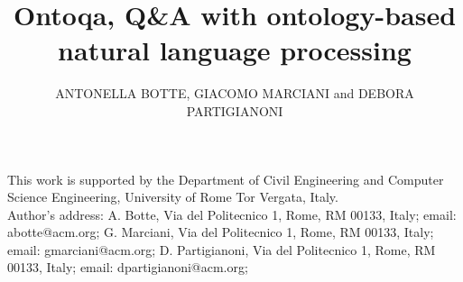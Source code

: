 \documentclass[acmutv-cw-ai]{acmlarge}
\title{Ontoqa, Q\&A with ontology-based natural language processing}
\author{ANTONELLA BOTTE, GIACOMO MARCIANI and DEBORA PARTIGIANONI \affil{University of Rome Tor Vergata}}
\numberwithin{equation}{section}
\begin{document}
\begin{bottomstuff}
	This work is supported by the Department of Civil Engineering and Computer Science
	Engineering, University of Rome Tor Vergata, Italy.\\
	Author's address:
	A. Botte, Via del Politecnico 1, Rome, RM 00133, Italy;
	email: abotte@acm.org;
	G. Marciani, Via del Politecnico 1, Rome, RM 00133, Italy;
	email: gmarciani@acm.org;
	D. Partigianoni, Via del Politecnico 1, Rome, RM 00133, Italy;
	email: dpartigianoni@acm.org;
\end{bottomstuff}

\maketitle








\elecappendix

\end{document}
